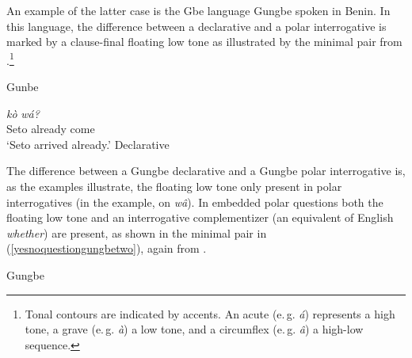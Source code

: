 An example of the latter case is the Gbe language Gungbe\label{gungbepolar} spoken in Benin. In this language, the difference between a declarative and a polar interrogative is marked by a clause-final floating low tone as illustrated by the minimal pair from \citet[93]{aboh2010sa}.\footnote{ Tonal contours are indicated by accents. An acute (e.\,g. \textit{á}) represents a high tone, a grave (e.\,g. \textit{à}) a low tone, and a circumflex (e.\,g. \textit{\^{a}}) a high-low sequence.}

\begin{exe}
\ex Gunbe\label{yesnoquestiongungbe}
\begin{xlist}
\ex {} {\textit{kò}} {\textit{wá?}} \\
{Seto} {already} {come}\\
\trans `Seto arrived already.' \label{yesnoquestiongungbea} \hfill Declarative
\end{xlist}
\end{exe}

\noindent The difference between a Gungbe declarative and a Gungbe polar interrogative is, as the examples illustrate, the floating low tone only present in polar interrogatives (in the example, on \textit{w\^{a}}). In embedded polar questions both the floating low tone and an interrogative complementizer (an equivalent of English \textit{whether}) are present, as shown in the minimal pair in (\ref{yesnoquestiongungbetwo}), again from \citet[93]{aboh2010sa}.

\begin{exe}
\ex Gungbe\label{yesnoquestiongungbetwo}\begin{xlist}
\end{xlist}
\end{exe}

